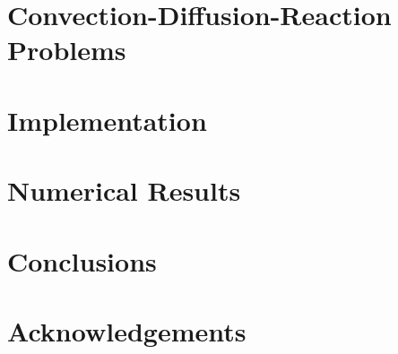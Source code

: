 \documentclass[12pt, oneside]{book}
\begin{document}
    \newpage
    \chapter{Convection-Diffusion-Reaction Problems} \label{chapter:cdr}

    


    \newpage
    \chapter{Implementation} \label{chapter:implementation}

    


    \newpage
    \chapter{Numerical Results} \label{chapter:results}

    


    \newpage
    \chapter*{Conclusions} \label{chapter:conclusions}

    


    \chapter*{Acknowledgements}

    


    \newpage

    \printbibliography


    \newpage
    
    
\end{document}
